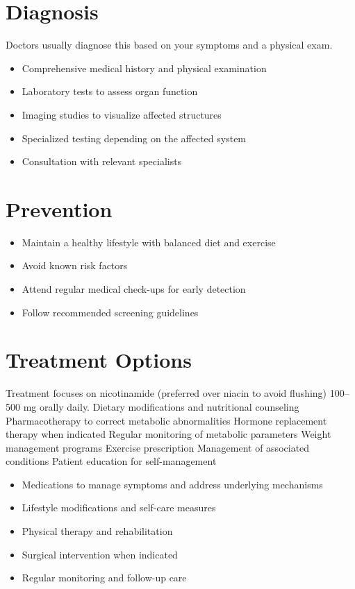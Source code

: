 \section{Diagnosis}
Doctors usually diagnose this based on your symptoms and a physical exam.

\begin{itemize}[noitemsep]
  \item Comprehensive medical history and physical examination
  \item Laboratory tests to assess organ function
  \item Imaging studies to visualize affected structures
  \item Specialized testing depending on the affected system
  \item Consultation with relevant specialists
\end{itemize}
\section{Prevention}
\begin{itemize}[noitemsep]
  \item Maintain a healthy lifestyle with balanced diet and exercise
  \item Avoid known risk factors
  \item Attend regular medical check-ups for early detection
  \item Follow recommended screening guidelines
\end{itemize}
\section{Treatment Options}
Treatment focuses on nicotinamide (preferred over niacin to avoid flushing) 100--500 mg orally daily. Dietary modifications and nutritional counseling Pharmacotherapy to correct metabolic abnormalities Hormone replacement therapy when indicated Regular monitoring of metabolic parameters Weight management programs Exercise prescription Management of associated conditions Patient education for self-management

\begin{itemize}[noitemsep]
  \item Medications to manage symptoms and address underlying mechanisms
  \item Lifestyle modifications and self-care measures
  \item Physical therapy and rehabilitation
  \item Surgical intervention when indicated
  \item Regular monitoring and follow-up care
\end{itemize}
